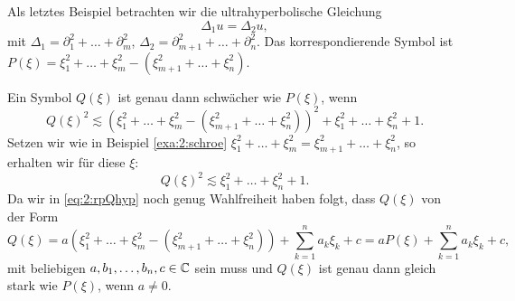 \begin{exa}\label{exa:2:hyper}
Als letztes Beispiel betrachten wir die ultrahyperbolische Gleichung
\begin{equation}
\Delta_1u=\Delta_2u,
\end{equation}
mit $\Delta_1=\partial_1^2+\dots+\partial_m^2$, $\Delta_2=\partial^2_{m+1}+\dots+\partial^2_n$.
Das korrespondierende Symbol ist $P(\xi)=\xi^2_1+\dots+\xi^2_m-(\xi^2_{m+1}+\dots+\xi^2_n)$.

Ein Symbol $Q(\xi)$ ist genau dann schwächer wie $P(\xi)$,
wenn
\begin{equation}
Q(\xi)^2\apprle(\xi^2_1+\dots+\xi^2_m-(\xi^2_{m+1}+\dots+\xi^2_n))^2+\xi^2_1+\dots+\xi^2_n+1.
\end{equation}
Setzen wir wie in Beispiel \ref{exa:2:schroe} $\xi^2_1+\dots+\xi^2_m=\xi^2_{m+1}+\dots+\xi^2_n$,
so erhalten wir für diese $\xi$:
\begin{equation}\label{eq:2:rpQhyp}
Q(\xi)^2\apprle\xi^2_1+\dots+\xi^2_n+1.
\end{equation}
Da wir in \eqref{eq:2:rpQhyp} noch genug Wahlfreiheit haben folgt,
dass $Q(\xi)$ von der Form
\begin{equation}
Q(\xi)=a(\xi_1^2+\dots+\xi^2_m-(\xi^2_{m+1}+\dots+\xi^2_n))+\sum_{k=1}^na_k\xi_k+c
=aP(\xi)+\sum_{k=1}^na_k\xi_k+c,
\end{equation}
mit beliebigen $a,b_1,\dots,b_n,c\in\mathbb C$ sein muss
und $Q(\xi)$ ist genau dann gleich stark wie $P(\xi)$,
wenn $a\neq0$.
\end{exa}

